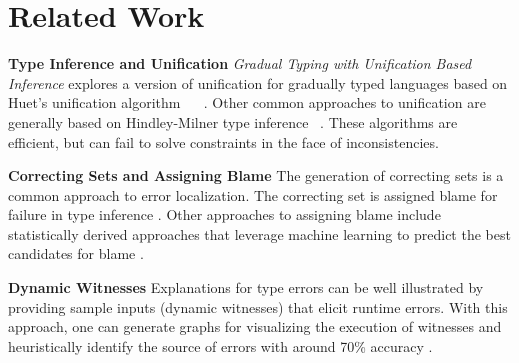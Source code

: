 \section{Related Work}
\label{sec:related}
\textbf{Type Inference and Unification} \emph{Gradual Typing with Unification Based Inference} explores a version of unification for gradually typed languages based on Huet's unification algorithm ~\cite{GradualInfer} ~\cite{Huet}. Other common approaches to unification are generally based on Hindley-Milner type inference ~\cite{MilnerInfer}. These algorithms are efficient, but can fail to solve constraints in the face of inconsistencies.


\textbf{Correcting Sets and Assigning Blame} The generation of correcting sets is a common approach to error localization. The correcting set is assigned blame for failure in type inference \cite{sherrloc} \cite{typeinferDif} \cite{Pavlinovic2015}. Other approaches to assigning blame include statistically derived approaches that leverage machine learning to predict the best candidates for blame \cite{SeidelBlame}.

\textbf{Dynamic Witnesses} Explanations for type errors can be well illustrated by providing sample inputs (dynamic witnesses) that elicit runtime errors. With this approach, one can generate graphs for visualizing the execution of witnesses and heuristically identify the source of errors with around 70\% accuracy \cite{Seidel2016}.



